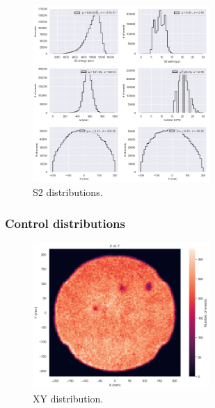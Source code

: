 \begin{frame}
\begin{figure}
  \begin{center}
      \includegraphics[width=0.6\textwidth]{img/r6581/s2.png}
    \caption{S2 distributions.}
  \end{center}
\end{figure}
\end{frame}

\begin{frame}
\frametitle{Control distributions}
\begin{figure}
  \begin{center}
      \includegraphics[width=0.6\textwidth]{img/r6581/xy.png}
    \caption{XY distribution.}
  \end{center}
\end{figure}
\end{frame}

